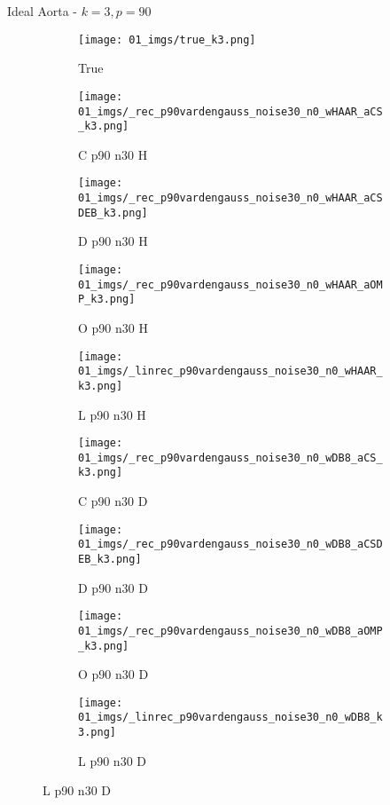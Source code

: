 \begin{frame}{Ideal Aorta - $k=3,p=90$}{}
\begin{figure}
\begin{subfigure}{0.1\textwidth}
\texttt{[image: 01\_imgs/true\_k3.png]}
\caption*{\Tiny True}
\end{subfigure}
\begin{subfigure}{0.1\textwidth}
\texttt{[image: 01\_imgs/\_rec\_p90vardengauss\_noise30\_n0\_wHAAR\_aCS\_k3.png]}
\caption*{\Tiny C p90 n30 H}
\end{subfigure}
\begin{subfigure}{0.1\textwidth}
\texttt{[image: 01\_imgs/\_rec\_p90vardengauss\_noise30\_n0\_wHAAR\_aCSDEB\_k3.png]}
\caption*{\Tiny D p90 n30 H}
\end{subfigure}
\begin{subfigure}{0.1\textwidth}
\texttt{[image: 01\_imgs/\_rec\_p90vardengauss\_noise30\_n0\_wHAAR\_aOMP\_k3.png]}
\caption*{\Tiny O p90 n30 H}
\end{subfigure}
\begin{subfigure}{0.1\textwidth}
\texttt{[image: 01\_imgs/\_linrec\_p90vardengauss\_noise30\_n0\_wHAAR\_k3.png]}
\caption*{\Tiny L p90 n30 H}
\end{subfigure}
\begin{subfigure}{0.1\textwidth}
\texttt{[image: 01\_imgs/\_rec\_p90vardengauss\_noise30\_n0\_wDB8\_aCS\_k3.png]}
\caption*{\Tiny C p90 n30 D}
\end{subfigure}
\begin{subfigure}{0.1\textwidth}
\texttt{[image: 01\_imgs/\_rec\_p90vardengauss\_noise30\_n0\_wDB8\_aCSDEB\_k3.png]}
\caption*{\Tiny D p90 n30 D}
\end{subfigure}
\begin{subfigure}{0.1\textwidth}
\texttt{[image: 01\_imgs/\_rec\_p90vardengauss\_noise30\_n0\_wDB8\_aOMP\_k3.png]}
\caption*{\Tiny O p90 n30 D}
\end{subfigure}
\begin{subfigure}{0.1\textwidth}
\texttt{[image: 01\_imgs/\_linrec\_p90vardengauss\_noise30\_n0\_wDB8\_k3.png]}
\caption*{\Tiny L p90 n30 D}
\end{subfigure}
\end{figure}
\end{frame}


